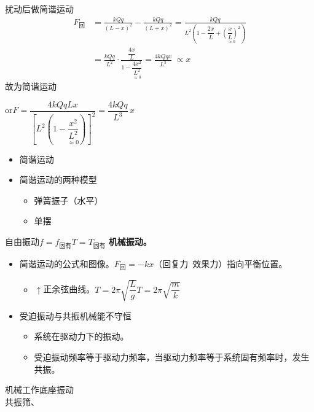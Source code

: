 扰动后做简谐运动
\begin{align*}
F_{\text{回}}&=\frac{kQq}{(L-x)^{2}}-\frac{kQq}{(L+x)^{2}}
=\frac{kQq}{L^{2}\left(1-\dfrac{2x}{L}+\underset{\approx0}{\left(\dfrac{x}{L}\right)^{2}}\right)}\\
&=\frac{kQq}{L^{2}}\cdot\frac{\dfrac{4x}{L}}{1-\underset{\approx0}{\dfrac{4x^{2}}{L^{2}}}}=\frac{4kQqx}{L^{3}}\ \propto x
\end{align*}
故为简谐运动

or\quad $F=\dfrac{4kQqLx}{\left[L^{2}\left(1-\underset{\approx0}{\dfrac{x^{2}}{L^{2}}}\right)\right]^{2}}=\dfrac{4kQq}{L^{3}}\,x$
\begin{itemize}
\item 简谐运动
\item 简谐运动的两种模型
  \begin{itemize}
  \item 弹簧振子（水平）
  \item 单摆
  \end{itemize}
\end{itemize}
自由振动\quad $f=f_{\text{固有}}$\quad $T=T_{\text{固有}}$
\textbf{机械振动。}
\begin{itemize}
\item 简谐运动的公式和图像。\quad $F_{\text{回}}=-kx$（回复力\ 效果力）指向平衡位置。
  \begin{itemize}
  \item $\uparrow$正余弦曲线。\quad $T=2\pi\sqrt{\dfrac{L}{g}}$\quad $T=2\pi\sqrt{\dfrac{m}{k}}$
  \end{itemize}
\end{itemize}
\begin{itemize}
\item 受迫振动与共振\quad 机械能不守恒
  \begin{itemize}
  \item 系统在驱动力下的振动。
  \item 受迫振动频率等于驱动力频率，当驱动力频率等于系统固有频率时，发生共振。
  \end{itemize}
\end{itemize}
机械工作底座振动\\
共振筛、

